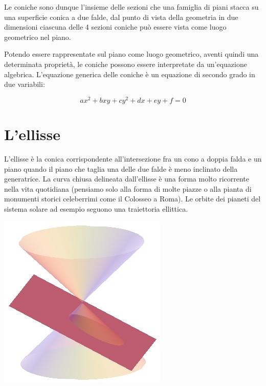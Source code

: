 Le coniche sono dunque l'insieme delle sezioni che una famiglia di piani 
stacca su una superficie conica a due falde, dal punto di vista della 
geometria in due dimensioni ciascuna delle 4 sezioni coniche può essere 
vista come luogo geometrico nel piano.

Potendo essere rappresentate sul piano come luogo geometrico, aventi quindi 
una determinata proprietà, le coniche possono essere interpretate da 
un'equazione algebrica. L'equazione generica delle coniche è un equazione 
di secondo grado in due variabili: 

\[ax^{2}+bxy+cy^{2}+dx+ey+f=0\] 

\section{L'ellisse}
\label{sec:ellisse_}

\noindent\begin{minipage}{.75\textwidth}
  L'ellisse è la conica corrispondente all'intersezione fra un cono a 
doppia falda e un piano quando il piano che taglia una delle due falde è 
meno inclinato della generatrice. La curva chiusa delineata dall'ellisse è 
una forma molto ricorrente nella vita quotidiana (pensiamo solo alla forma 
di molte piazze o alla pianta di monumenti storici celeberrimi come il 
Colosseo a Roma). Le orbite dei pianeti del sistema solare ad esempio seguono 
una traiettoria ellittica.
\end{minipage}
\hspace{.5cm}
\begin{minipage}{.2\textwidth}
  \includegraphics[width=\textwidth]{img/elisse2.jpg}
\end{minipage} 

